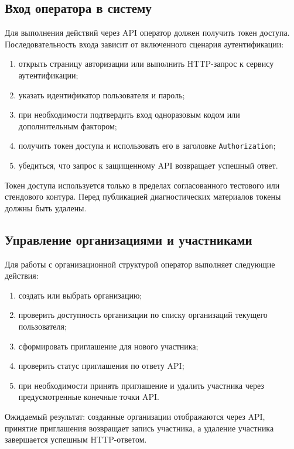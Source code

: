 \documentclass[12pt,a4paper]{extarticle}
\begin{document}
\subsection{Вход оператора в систему}

\begin{hseExample}
Для выполнения действий через API оператор должен получить токен доступа. Последовательность входа зависит от включенного сценария аутентификации:

\begin{enumerate}[label=\arabic*), leftmargin=1.25cm]
    \item открыть страницу авторизации или выполнить HTTP-запрос к сервису аутентификации;
    \item указать идентификатор пользователя и пароль;
    \item при необходимости подтвердить вход одноразовым кодом или дополнительным фактором;
    \item получить токен доступа и использовать его в заголовке \texttt{Authorization};
    \item убедиться, что запрос к защищенному API возвращает успешный ответ.
\end{enumerate}

Токен доступа используется только в пределах согласованного тестового или стендового контура. Перед публикацией диагностических материалов токены должны быть удалены.
\end{hseExample}

\subsection{Управление организациями и участниками}

\begin{hseExample}
Для работы с организационной структурой оператор выполняет следующие действия:

\begin{enumerate}[label=\arabic*), leftmargin=1.25cm]
    \item создать или выбрать организацию;
    \item проверить доступность организации по списку организаций текущего пользователя;
    \item сформировать приглашение для нового участника;
    \item проверить статус приглашения по ответу API;
    \item при необходимости принять приглашение и удалить участника через предусмотренные конечные точки API.
\end{enumerate}

Ожидаемый результат: созданные организации отображаются через API, принятие приглашения возвращает запись участника, а удаление участника завершается успешным HTTP-ответом.
\end{hseExample}
\end{document}
